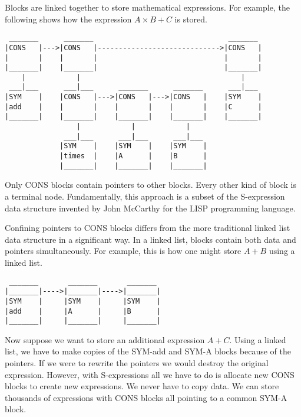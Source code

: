 \noindent
Blocks are linked together to store mathematical expressions.
For example, the following shows how the expression
$A\times B+C$ is stored.
\begin{verbatim}
 _______      _______                                _______
|CONS   |--->|CONS   |----------------------------->|CONS   |
|       |    |       |                              |       |
|_______|    |_______|                              |_______|
    |            |                                      |
 ___|___      ___|___      _______      _______      ___|___
|SYM    |    |CONS   |--->|CONS   |--->|CONS   |    |SYM    |
|add    |    |       |    |       |    |       |    |C      |
|_______|    |_______|    |_______|    |_______|    |_______|
                 |            |            |
              ___|___      ___|___      ___|___
             |SYM    |    |SYM    |    |SYM    |
             |times  |    |A      |    |B      |
             |_______|    |_______|    |_______|
\end{verbatim}

\bigskip
\noindent
Only CONS blocks contain pointers to other blocks.
Every other kind of block is a terminal node.
Fundamentally, this approach is a subset of the S-expression data structure
invented by John McCarthy for the LISP programming language.

\newpage

\noindent
Confining pointers to CONS blocks differs from the more traditional linked
list data structure in a significant way.
In a linked list, blocks contain both data and pointers simultaneously.
For example, this is how one might store $A+B$ using a linked list.
\begin{verbatim}
 _______       _______       _______
|_______|---->|_______|---->|_______|
|SYM    |     |SYM    |     |SYM    |
|add    |     |A      |     |B      |
|_______|     |_______|     |_______|
\end{verbatim}

\bigskip
\noindent
Now suppose we want to store an additional expression $A+C$.
Using a linked list, we have to make copies of the SYM-add and
SYM-A blocks
because of the pointers.
If we were to rewrite the pointers we would destroy the original
expression.
However, with S-expressions all we have to do is allocate new CONS
blocks to create new expressions.
We never have to copy data.
We can store thousands of expressions with CONS
blocks all pointing to a common SYM-A block.

\newpage

